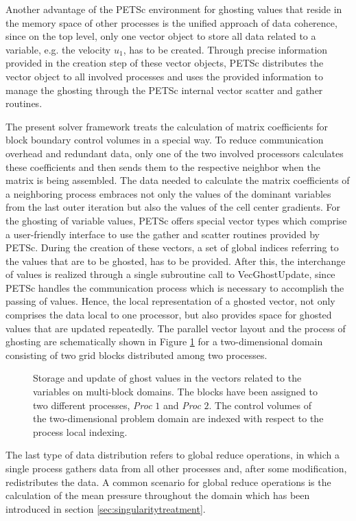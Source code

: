 Another advantage of the PETSc environment for ghosting values that reside in the memory space of other processes is the unified approach of data coherence, since on the top level, only one vector object to store all data related to a variable, e.g. the velocity \(u_1\), has to be created. Through precise information provided in the creation step of these vector objects, PETSc distributes the vector object to all involved processes and uses the provided information to manage the ghosting through the PETSc internal vector scatter and gather routines. 

The present solver framework treats the calculation of matrix coefficients for block boundary control volumes in a special way. To reduce communication overhead and redundant data, only one of the two involved processors calculates these coefficients and then sends them to the respective neighbor when the matrix is being assembled. The data needed to calculate the matrix coefficients of a neighboring process embraces not only the values of the dominant variables from the last outer iteration but also the values of the cell center gradients. For the ghosting of variable values, PETSc offers special vector types which comprise a user-friendly interface to use the gather and scatter routines provided by PETSc. During the creation of these vectors, a set of global indices referring to the values that are to be ghosted, has to be provided. After this, the interchange of values is realized through a single subroutine call to \textrm{VecGhostUpdate}, since PETSc handles the communication process which is necessary to accomplish the passing of values. Hence, the local representation of a ghosted vector, not only comprises the data local to one processor, but also provides space for ghosted values that are updated repeatedly. The parallel vector layout and the process of ghosting are schematically shown in Figure \ref{fig:ghosting} for a two-dimensional domain consisting of two grid blocks distributed among two processes.

\begin{figure}[h!]
  \centering
  
  \caption{Storage and update of ghost values in the vectors related to the variables on multi-block domains. The blocks have been assigned to two different processes, \emph{Proc} $1$ and \emph{Proc} $2$. The control volumes of the two-dimensional problem domain are indexed with respect to the process local indexing.}
  \label{fig:ghosting}
\end{figure}

The last type of data distribution refers to global reduce operations, in which a single process gathers data from all other processes and, after some modification, redistributes the data. A common scenario for global reduce operations is the calculation of the mean pressure throughout the domain which has been introduced in section \ref{sec:singularitytreatment}.


